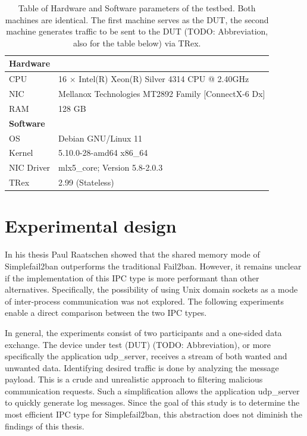 \begin{table}[b!]
    \renewcommand{\arraystretch}{1.5}
    \caption[Testbed specs]{Table of Hardware and Software parameters of the testbed. Both machines are identical.
    The first machine serves as the DUT, the second machine generates traffic to be sent to the DUT (TODO: Abbreviation, also for the table below) via TRex.}\label{tab:specs}
    \centering
    \small
    \begin{tabular}{ll}
        \toprule
        \multicolumn{2}{l}{\textbf{Hardware}} \\ \midrule
        CPU     & 16 $\times$ Intel(R) Xeon(R) Silver 4314 CPU @ 2.40GHz \\
        NIC     & Mellanox Technologies MT2892 Family [ConnectX-6 Dx] \\
        RAM     & 128 GB \\ \bottomrule

        \multicolumn{2}{l}{\textbf{Software}} \\ \midrule
        OS          & Debian GNU/Linux 11 \\
        Kernel      & 5.10.0-28-amd64 x86\_64 \\
        NIC Driver  & mlx5\_core; Version 5.8-2.0.3 \\
        TRex        & 2.99 (Stateless) \\ \bottomrule
    \end{tabular}
\end{table}

\section{Experimental design}
In his thesis\cite{raatschen:ipc} Paul Raatschen showed that the shared memory mode of Simplefail2ban outperforms the traditional Fail2ban.
However, it remains unclear if the implementation of this IPC type is more performant than other alternatives.
Specifically, the possibility of using Unix domain sockets as a mode of inter-process communication was not explored.
The following experiments enable a direct comparison between the two IPC types.

\noindent
In general, the experiments consist of two participants and a one-sided data exchange.
The device under test (DUT) (TODO: Abbreviation), or more specifically the application udp\_server, receives a stream of both wanted and unwanted data.
Identifying desired traffic is done by analyzing the message payload.
This is a crude and unrealistic approach to filtering malicious communication requests.
Such a simplification allows the application udp\_server to quickly generate log messages.
Since the goal of this study is to determine the most efficient IPC type for Simplefail2ban, this abstraction does not diminish the findings of this thesis.

